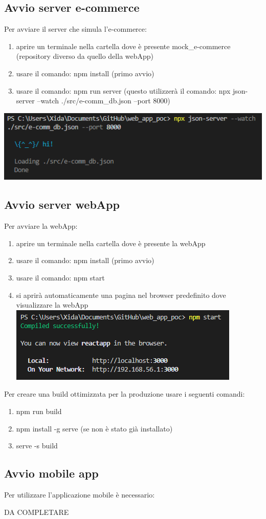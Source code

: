 \subsection{Avvio server e-commerce}
Per avviare il server che simula l'e-commerce:

\begin{enumerate}
    \item aprire un terminale nella cartella dove è presente mock\_e-commerce (repository diverso da quello della webApp)
    \item usare il comando: npm install (primo avvio)
    \item usare il comando: npm run server (questo utilizzerà il comando: npx json-server --watch ./src/e-comm\_db.json --port 8000)
\end{enumerate}

\includegraphics[]{img/ecommerce.PNG}

\subsection{Avvio server webApp}
Per avviare la webApp:
\begin{enumerate}
    \item aprire un terminale nella cartella dove è presente la webApp
    \item usare il comando: npm install (primo avvio)
    \item usare il comando: npm start
    \item si aprirà automaticamente una pagina nel browser predefinito dove visualizzare la webApp \\
    \includegraphics[]{img/webApp.PNG}
\end{enumerate}
Per creare una build ottimizzata per la produzione usare i seguenti comandi:
\begin{enumerate}
    \item npm run build
    \item npm install -g serve (se non è stato già installato)
    \item serve -s build
\end{enumerate}

\subsection{Avvio mobile app}
Per utilizzare l'applicazione mobile è necessario:

DA COMPLETARE
